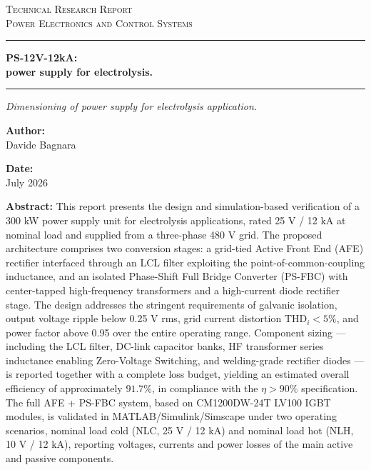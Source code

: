 \documentclass[12pt,a4paper]{scrartcl}
\newcommand{\DocCategory}{Technical Research Report}
\newcommand{\DocField}{Power Electronics and Control Systems}
\newcommand{\DocTitle}{%
	{\fontsize{20}{24}\selectfont\bfseries PS-12V-12kA:} \\[16pt]
	{\fontsize{16}{20}\selectfont\bfseries power supply for electrolysis.}
}
\newcommand{\DocSubtitle}{%
	Dimensioning of power supply for electrolysis application. 
}
\newcommand{\DocAuthor}{Davide Bagnara}
\newcommand{\DocDate}{July 2026}
\newcommand{\DocAbstract}{%
	This report presents the design and simulation-based verification of a 300 kW power supply unit for electrolysis applications, rated 25 V / 12 kA at nominal load and supplied from a three-phase 480 V grid. The proposed architecture comprises two conversion stages: a grid-tied Active Front End (AFE) rectifier interfaced through an LCL filter exploiting the point-of-common-coupling inductance, and an isolated Phase-Shift Full Bridge Converter (PS-FBC) with center-tapped high-frequency transformers and a high-current diode rectifier stage. The design addresses the stringent requirements of galvanic isolation, output voltage ripple below 0.25 V rms, grid current distortion $\text{THD}_i<5\% $, and power factor above 0.95 over the entire operating range. Component sizing — including the LCL filter, DC-link capacitor banks, HF transformer series inductance enabling Zero-Voltage Switching, and welding-grade rectifier diodes — is reported together with a complete loss budget, yielding an estimated overall efficiency of approximately $91.7\%$, in compliance with the $\eta > 90 \%$ specification. The full AFE + PS-FBC system, based on CM1200DW-24T LV100 IGBT modules, is validated in MATLAB/Simulink/Simscape under two operating scenarios, nominal load cold (NLC, 25 V / 12 kA) and nominal load hot (NLH, 10 V / 12 kA), reporting voltages, currents and power losses of the main active and passive components.
}
\begin{document}
	\titlepage
	\begin{center}
		{\Large\scshape \DocCategory}\\[8pt]
		{\large\scshape \DocField}
	\end{center}
	
	\vspace{36pt}
	\noindent\rule{\linewidth}{0.8pt}
	
	\vspace{16pt}
	\begin{center}
		\DocTitle
	\end{center}
	
	\vspace{4pt}
	\noindent\rule{\linewidth}{2.2pt}
	
	\begin{center}
		\begin{onehalfspace}
			{\large\itshape \DocSubtitle}
		\end{onehalfspace}
	\end{center}
	
	\vspace{18pt}
	
	\begin{minipage}{0.92\linewidth}
		\noindent
		\begin{minipage}[t]{0.48\linewidth}
			\textbf{Author:}\\[2pt]
			\DocAuthor
		\end{minipage}%
		\hfill
		\begin{minipage}[t]{0.48\linewidth}
			\raggedleft
			\textbf{Date:}\\[2pt]
			\DocDate
		\end{minipage}
	\end{minipage}
	\vspace{36pt}
	
	\begin{center}
		\begin{minipage}{0.85\linewidth}
			\footnotesize 
			\begin{onehalfspace}
				\textbf{Abstract:} \DocAbstract
			\end{onehalfspace}
		\end{minipage}
	\end{center}
	
\end{document}
